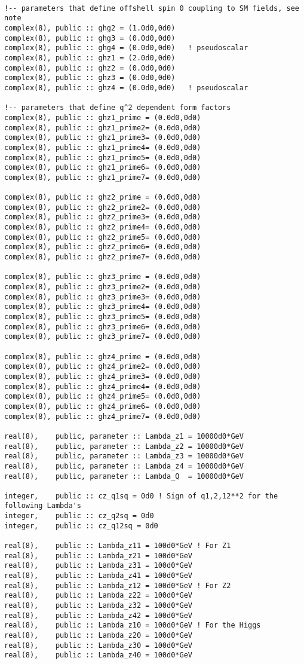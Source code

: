 \documentclass[aps,superscriptaddress,nofootinbib]{revtex4}
\begin{document}
\begin{verbatim}

!-- parameters that define offshell spin 0 coupling to SM fields, see note
complex(8), public :: ghg2 = (1.0d0,0d0)
complex(8), public :: ghg3 = (0.0d0,0d0)
complex(8), public :: ghg4 = (0.0d0,0d0)   ! pseudoscalar
complex(8), public :: ghz1 = (2.0d0,0d0)
complex(8), public :: ghz2 = (0.0d0,0d0)
complex(8), public :: ghz3 = (0.0d0,0d0)
complex(8), public :: ghz4 = (0.0d0,0d0)   ! pseudoscalar

!-- parameters that define q^2 dependent form factors
complex(8), public :: ghz1_prime = (0.0d0,0d0)
complex(8), public :: ghz1_prime2= (0.0d0,0d0)
complex(8), public :: ghz1_prime3= (0.0d0,0d0)
complex(8), public :: ghz1_prime4= (0.0d0,0d0)
complex(8), public :: ghz1_prime5= (0.0d0,0d0)
complex(8), public :: ghz1_prime6= (0.0d0,0d0)
complex(8), public :: ghz1_prime7= (0.0d0,0d0)

complex(8), public :: ghz2_prime = (0.0d0,0d0)
complex(8), public :: ghz2_prime2= (0.0d0,0d0)
complex(8), public :: ghz2_prime3= (0.0d0,0d0)
complex(8), public :: ghz2_prime4= (0.0d0,0d0)
complex(8), public :: ghz2_prime5= (0.0d0,0d0)
complex(8), public :: ghz2_prime6= (0.0d0,0d0)
complex(8), public :: ghz2_prime7= (0.0d0,0d0)

complex(8), public :: ghz3_prime = (0.0d0,0d0)
complex(8), public :: ghz3_prime2= (0.0d0,0d0)
complex(8), public :: ghz3_prime3= (0.0d0,0d0)
complex(8), public :: ghz3_prime4= (0.0d0,0d0)
complex(8), public :: ghz3_prime5= (0.0d0,0d0)
complex(8), public :: ghz3_prime6= (0.0d0,0d0)
complex(8), public :: ghz3_prime7= (0.0d0,0d0)

complex(8), public :: ghz4_prime = (0.0d0,0d0)
complex(8), public :: ghz4_prime2= (0.0d0,0d0)
complex(8), public :: ghz4_prime3= (0.0d0,0d0)
complex(8), public :: ghz4_prime4= (0.0d0,0d0)
complex(8), public :: ghz4_prime5= (0.0d0,0d0)
complex(8), public :: ghz4_prime6= (0.0d0,0d0)
complex(8), public :: ghz4_prime7= (0.0d0,0d0)

real(8),    public, parameter :: Lambda_z1 = 10000d0*GeV
real(8),    public, parameter :: Lambda_z2 = 10000d0*GeV
real(8),    public, parameter :: Lambda_z3 = 10000d0*GeV
real(8),    public, parameter :: Lambda_z4 = 10000d0*GeV
real(8),    public, parameter :: Lambda_Q  = 10000d0*GeV

integer,    public :: cz_q1sq = 0d0 ! Sign of q1,2,12**2 for the following Lambda's
integer,    public :: cz_q2sq = 0d0
integer,    public :: cz_q12sq = 0d0

real(8),    public :: Lambda_z11 = 100d0*GeV ! For Z1
real(8),    public :: Lambda_z21 = 100d0*GeV
real(8),    public :: Lambda_z31 = 100d0*GeV
real(8),    public :: Lambda_z41 = 100d0*GeV
real(8),    public :: Lambda_z12 = 100d0*GeV ! For Z2
real(8),    public :: Lambda_z22 = 100d0*GeV
real(8),    public :: Lambda_z32 = 100d0*GeV
real(8),    public :: Lambda_z42 = 100d0*GeV
real(8),    public :: Lambda_z10 = 100d0*GeV ! For the Higgs
real(8),    public :: Lambda_z20 = 100d0*GeV
real(8),    public :: Lambda_z30 = 100d0*GeV
real(8),    public :: Lambda_z40 = 100d0*GeV
\end{verbatim}
\end{document}
